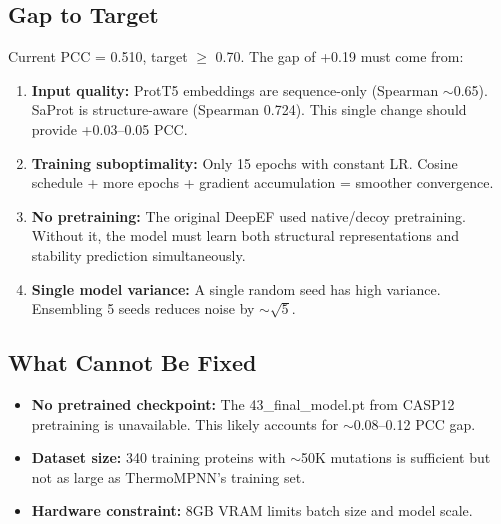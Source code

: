 \subsection{Gap to Target}

Current PCC = 0.510, target $\geq$ 0.70. The gap of +0.19 must come from:
\begin{enumerate}
    \item \textbf{Input quality:} ProtT5 embeddings are sequence-only (Spearman $\sim$0.65). SaProt is structure-aware (Spearman 0.724). This single change should provide +0.03--0.05 PCC.
    \item \textbf{Training suboptimality:} Only 15 epochs with constant LR. Cosine schedule + more epochs + gradient accumulation = smoother convergence.
    \item \textbf{No pretraining:} The original DeepEF used native/decoy pretraining. Without it, the model must learn both structural representations and stability prediction simultaneously.
    \item \textbf{Single model variance:} A single random seed has high variance. Ensembling 5 seeds reduces noise by $\sim\sqrt{5}$.
\end{enumerate}

\subsection{What Cannot Be Fixed}

\begin{itemize}
    \item \textbf{No pretrained checkpoint:} The 43\_final\_model.pt from CASP12 pretraining is unavailable. This likely accounts for $\sim$0.08--0.12 PCC gap.
    \item \textbf{Dataset size:} 340 training proteins with $\sim$50K mutations is sufficient but not as large as ThermoMPNN's training set.
    \item \textbf{Hardware constraint:} 8GB VRAM limits batch size and model scale.
\end{itemize}
